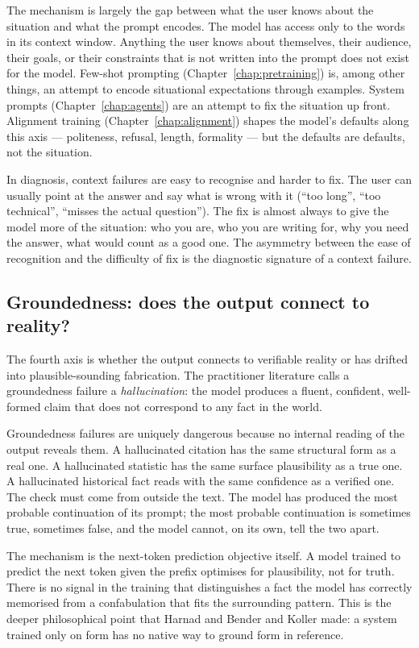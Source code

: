 The mechanism is largely the gap between what the user knows
about the situation and what the prompt encodes. The model
has access only to the words in its context window. Anything
the user knows about themselves, their audience, their goals,
or their constraints that is not written into the prompt does
not exist for the model. Few-shot prompting (Chapter~\ref{chap:pretraining}) is,
among other things, an attempt to encode situational
expectations through examples. System prompts (Chapter~\ref{chap:agents})
are an attempt to fix the situation up front. Alignment
training (Chapter~\ref{chap:alignment}) shapes the model's defaults along this
axis --- politeness, refusal, length, formality --- but the
defaults are defaults, not the situation.

In diagnosis, context failures are easy to recognise and
harder to fix. The user can usually point at the answer and
say what is wrong with it (``too long'', ``too technical'',
``misses the actual question''). The fix is almost always to
give the model more of the situation: who you are, who you
are writing for, why you need the answer, what would count as
a good one. The asymmetry between the ease of recognition and
the difficulty of fix is the diagnostic signature of a context
failure.

\subsection*{Groundedness: does the output connect to reality?}

The fourth axis is whether the output connects to verifiable
reality or has drifted into plausible-sounding fabrication.
The practitioner literature calls a groundedness failure a
\emph{hallucination}: the model produces a fluent, confident,
well-formed claim that does not correspond to any fact in
the world.

Groundedness failures are uniquely dangerous because no internal
reading of the output reveals them. A hallucinated citation
has the same structural form as a real one. A hallucinated
statistic has the same surface plausibility as a true one. A
hallucinated historical fact reads with the same confidence
as a verified one. The check must come from outside the text.
The model has produced the most probable continuation of its
prompt; the most probable continuation is sometimes true,
sometimes false, and the model cannot, on its own, tell the
two apart.

The mechanism is the next-token prediction objective itself.
A model trained to predict the next token given the prefix
optimises for plausibility, not for truth. There is no signal
in the training that distinguishes a fact the model has
correctly memorised from a confabulation that fits the
surrounding pattern. This is the deeper philosophical point
that Harnad and Bender and Koller made: a system trained only
on form has no native way to ground form in reference.

